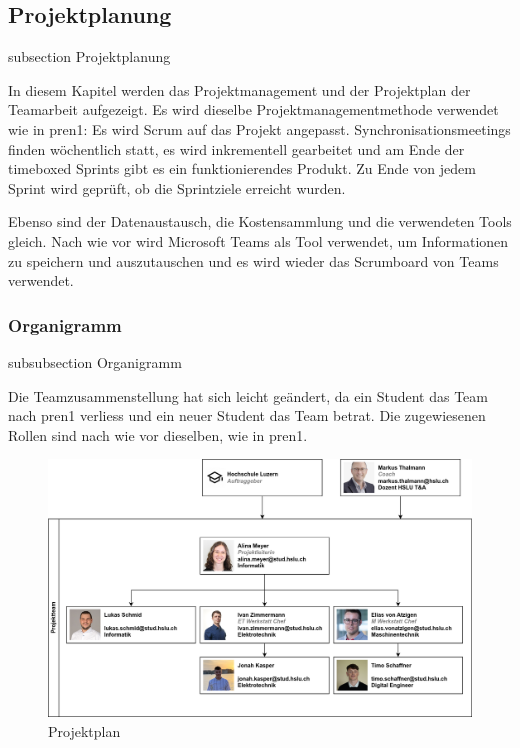 \subsection*{Projektplanung}
\label{projektplanung}
    {subsection}
    {Projektplanung}

In diesem Kapitel werden das Projektmanagement und der Projektplan der Teamarbeit aufgezeigt.
Es wird dieselbe Projektmanagementmethode verwendet wie in \acrfull{pren1}: Es wird Scrum auf das Projekt angepasst. Synchronisationsmeetings finden wöchentlich statt, es wird inkrementell gearbeitet und am Ende der timeboxed Sprints gibt es ein funktionierendes Produkt. Zu Ende von jedem Sprint wird geprüft, ob die Sprintziele erreicht wurden.\cite{wikipedia-scrum}

Ebenso sind der Datenaustausch, die Kostensammlung und die verwendeten Tools gleich. Nach wie vor wird Microsoft Teams als Tool verwendet, um Informationen zu speichern und auszutauschen und es wird wieder das Scrumboard von Teams verwendet.

\subsubsection*{Organigramm}
    {subsubsection}
    {Organigramm}

Die Teamzusammenstellung hat sich leicht geändert, da ein Student das Team nach \acrshort{pren1} verliess und ein neuer Student das Team betrat. Die zugewiesenen Rollen sind nach wie vor dieselben, wie in \acrshort{pren1}.

\begin{figure}[H]
\centering
\includegraphics[width=\textwidth]{assets/projektmanagement/Organigramm.png}
\caption{Projektplan}
\label{fig:project-plan}
\end{figure}

